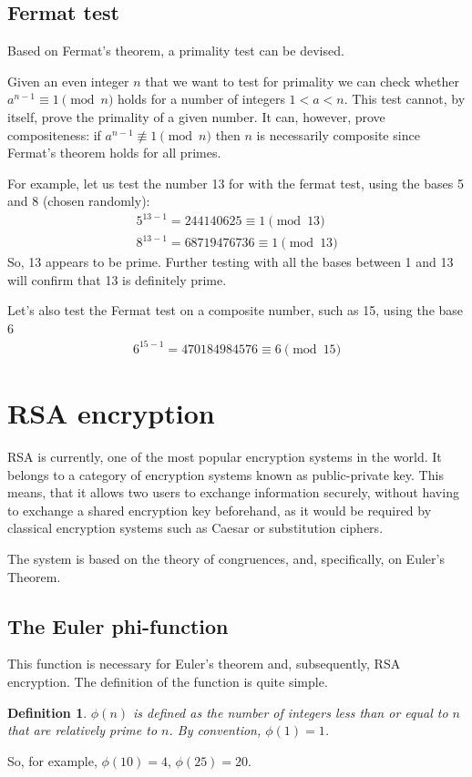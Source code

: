 \documentclass[12pt, titlepage]{article}
\newtheorem*{definition}{Definition}
\begin{document}
    \subsection{Fermat test}
    Based on Fermat's theorem, a primality test can be devised.

    Given an even integer $n$ that we want to test for primality we can check
    whether $a^{n-1} \equiv 1 \pmod{n}$ holds for a number of integers $1<a<n$.
    This test cannot, by itself, prove the primality of a given number. It can,
    however, prove compositeness: if $a^{n-1} \not\equiv 1 \pmod{n}$ then $n$ is
    necessarily composite since Fermat's theorem holds for all primes.

    For example, let us test the number 13 for with the fermat test, using the
    bases 5 and 8 (chosen randomly):
    \begin{align*}
        5^{13-1} = 244140625   \equiv 1 \pmod{13}\\
        8^{13-1} = 68719476736 \equiv 1 \pmod{13}
    \end{align*}
    So, 13 appears to be prime. Further testing with all the bases between 1 and
    13 will confirm that 13 is definitely prime.

    Let's also test the Fermat test on a composite number, such as 15, using the
    base 6
    \begin{align*}
        6^{15-1} = 470184984576 \equiv 6 \pmod{15}
    \end{align*}



\section{RSA encryption}
RSA is currently, one of the most popular encryption systems in the world.
It belongs to a category of encryption systems known as public-private key.
This means, that it allows two users to exchange information securely,
without having to exchange a shared encryption key beforehand, as it would
be required by classical encryption systems such as Caesar or substitution
ciphers. 

The system is based on the theory of congruences, and, specifically, on
Euler's Theorem.

    \subsection{The Euler phi-function}
    This function is necessary for Euler's theorem and, subsequently, RSA
    encryption. The definition of the
    function is quite simple.
    \begin{definition}
        $\phi(n)$ is defined as the \emph{number} of integers less than or equal
        to $n$ that are relatively prime to $n$. By convention, $\phi(1) = 1$.
    \end{definition}
    So, for example, $\phi(10) = 4$, $\phi(25) = 20$.
\end{document}
